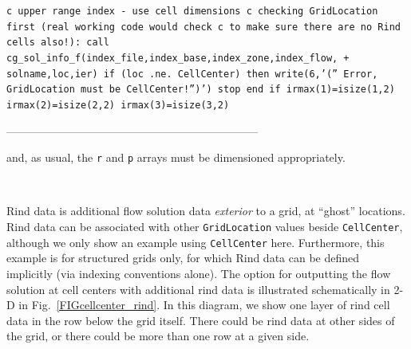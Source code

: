 \documentclass[12pt]{article}
\begin{document}
{\tt \noindent c   upper range index - use cell dimensions
\newline c   checking GridLocation first (real working code would check
\newline c   to make sure there are no Rind cells also!):
\newline\indent      call cg\_sol\_info\_f(index\_file,index\_base,index\_zone,index\_flow,
\newline + \indent solname,loc,ier)
\newline\indent      if (loc .ne. CellCenter) then
\newline\indent\indent        write(6,'('' Error, GridLocation must be CellCenter!'')')
\newline\indent\indent        stop
\newline\indent      end if
\newline\indent      irmax(1)=isize(1,2)
\newline\indent      irmax(2)=isize(2,2)
\newline\indent      irmax(3)=isize(3,2)}

--------------------------------------------------------------------

\noindent and, as usual, the {\tt r} and {\tt p} arrays must be dimensioned 
appropriately.

~

\noindent{}

Rind data is additional flow solution data {\it exterior} to a
grid, at ``ghost'' locations.  Rind data
can be associated with other {\tt GridLocation} values
beside {\tt CellCenter}, although we only show an example
using {\tt CellCenter} here.
Furthermore, this example is for structured grids only, for which Rind
data can be defined implicitly (via indexing conventions alone).
The option for outputting the flow solution at cell centers
with additional rind data is illustrated schematically in 2-D in
Fig.~\ref{FIGcellcenter_rind}.  In this diagram, we show one layer
of rind cell data in the row below the grid itself.  There could be
rind data at other sides of the grid, or there could be
more than one row at a given side.  
\end{document}
